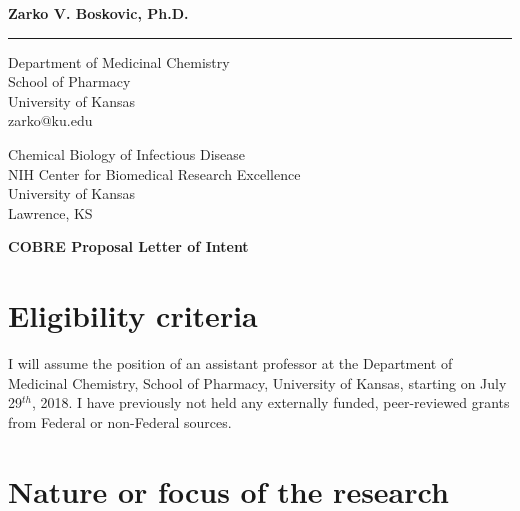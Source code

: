 \documentclass{letter}
\begin{document}
\begin{letter}{}

\begin{minipage}{\textwidth}
    \vspace{-1cm}
    \begin{flushleft}
    {\large\bf Zarko V. Boskovic, Ph.D.}
    \end{flushleft}
    \medskip\hrule height 1pt
    \begin{flushright}
    \hfill Department of Medicinal Chemistry \\
    \hfill School of Pharmacy\\
    \hfill University of Kansas\\
    \hfill zarko@ku.edu\\
    \end{flushright}
\end{minipage}

{Chemical Biology of Infectious Disease\\
NIH Center for Biomedical Research Excellence\\
University of Kansas\\
Lawrence, KS}
\begin{center}
\textbf{COBRE Proposal Letter of Intent}\\
\end{center}
\opening{}
\section{Eligibility criteria}
I will assume the position of an assistant professor at the Department of Medicinal Chemistry, School of Pharmacy, University of Kansas, starting on July 29$^{th}$, 2018. I have previously not held any externally funded, peer-reviewed grants from Federal or non-Federal sources.\\
\section{Nature or focus of the research}\\


\end{letter}
\end{document}
